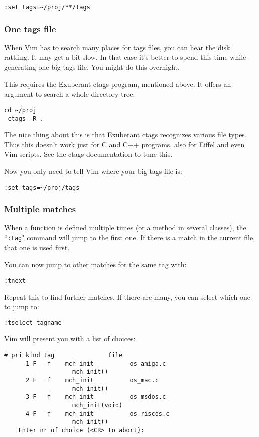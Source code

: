 \begin{Verbatim}[samepage=true]
 :set tags=~/proj/**/tags
\end{Verbatim}
\subsubsection{One tags file}
When Vim has to search many places for tags files, you can hear the disk rattling.
It may get a bit slow.
In that case it's better to spend this time while generating one big tags file.
You might do this overnight.

This requires the Exuberant ctags program, mentioned above.
It offers an argument to search a whole directory tree:

\begin{Verbatim}[samepage=true]
 cd ~/proj
 ctags -R .
\end{Verbatim}

The nice thing about this is that Exuberant ctags recognizes various file types.
Thus this doesn't work just for C and C++ programs, also for Eiffel and even Vim scripts.
See the ctags documentation to tune this.

Now you only need to tell Vim where your big tags file is:

\begin{Verbatim}[samepage=true]
 :set tags=~/proj/tags
\end{Verbatim}
\subsubsection{Multiple matches}
When a function is defined multiple times (or a method in several classes), the ``\texttt{:tag}" command will jump to the first one.
If there is a match in the current file, that one is used first.

You can now jump to other matches for the same tag with:

\begin{Verbatim}[samepage=true]
 :tnext
\end{Verbatim}

Repeat this to find further matches.
If there are many, you can select which one to jump to:

\begin{Verbatim}[samepage=true]
 :tselect tagname
\end{Verbatim}

Vim will present you with a list of choices:

\begin{Verbatim}[samepage=true]
      # pri kind tag               file
      1 F   f    mch_init          os_amiga.c
                   mch_init()
      2 F   f    mch_init          os_mac.c
                   mch_init()
      3 F   f    mch_init          os_msdos.c
                   mch_init(void)
      4 F   f    mch_init          os_riscos.c
                   mch_init()
    Enter nr of choice (<CR> to abort):
\end{Verbatim}

